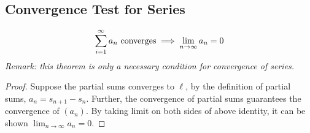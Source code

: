\documentclass[11pt]{article}
\begin{document}
	\subsection{Convergence Test for Series}
	\begin{theorem}
		\begin{align}
			\sum_{i=1}^\infty a_n \text{{ converges}} \implies \lim_{n \to \infty} a_n = 0
		\end{align}
		\emph{Remark: this theorem is only a necessary condition for convergence of series.}
	\end{theorem}
	
	\begin{proof}
		Suppose the partial sums converges to $\ell$, by the definition of partial sums, $a_n = s_{n+1} - s_{n}$. Further, the convergence of partial sums guarantees the convergence of $(a_n)$. By taking limit on both sides of above identity, it can be shown $\lim_{n \to \infty} a_n = 0$.
	\end{proof}
	
\end{document}
